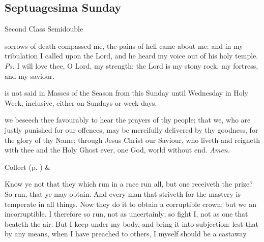 \subsection{Septuagesima Sunday}
\begin{inhead}
{Second Class Semidouble}
\end{inhead}


\introit
{} sorrows of death compassed me, the pains of hell came about me: and in my tribulation I called upon the Lord, and he heard my voice out of his holy temple. \textit{Ps.} I will love thee, O Lord, my strength: the Lord is my stony rock, my fortress, and my saviour.

\begin{rubric}
     is not said in Masses of the Season from this Sunday until Wednesday in Holy Week, inclusive, either on Sundays or week-days.
\end{rubric}

\collect
{} we beseech thee favourably to hear the prayers of thy people; that we, who are justly punished for our offences, may be mercifully delivered by thy goodness, for the glory of thy Name; through Jesus Christ our Saviour, who liveth and reigneth with thee and the Holy Ghost ever, one God, world without end. \textit{Amen.}
\begin{rubric}
     Collect  (p. \pageref{SPSaints}) \&  
\end{rubric}

 Know ye not that they which run in a race run all, but one receiveth the prize? So run, that ye may obtain. And every man that striveth for the mastery is temperate in all things. Now they do it to obtain a corruptible crown; but we an incorruptible. I therefore so run, not as uncertainly; so fight I, not as one that beateth the air: But I keep under my body, and bring it into subjection: lest that by any means, when I have preached to others, I myself should be a castaway.

\clearpage
{}


